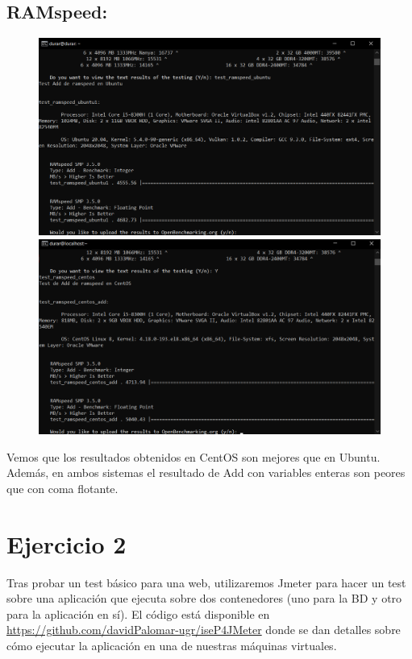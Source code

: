\documentclass[a4paper]{article}
\begin{document}
\subsection*{\textbf{RAMspeed:}}
\newpage
\begin{figure}[hbt!]
    \centering
    \includegraphics[width=\textwidth]{resultado ramspeed ubuntu.png}
    \includegraphics[width=\textwidth]{resultado ramspeed centos.png}
\end{figure}
Vemos que los resultados obtenidos en CentOS son mejores que en Ubuntu. Además, en ambos sistemas
el resultado de Add con variables enteras son peores que con coma flotante.
\newpage
\section{Ejercicio 2}
Tras probar un test básico para una web, utilizaremos Jmeter para hacer 
un test sobre una aplicación que ejecuta sobre dos contenedores (uno
para la BD y otro para la aplicación en sí). El código está disponible en 
\href{https://github.com/davidPalomar-ugr/iseP4JMeter}{https://github.com/davidPalomar-ugr/iseP4JMeter}
donde se dan detalles sobre cómo ejecutar la aplicación en una de nuestras máquinas virtuales.
\end{document}
